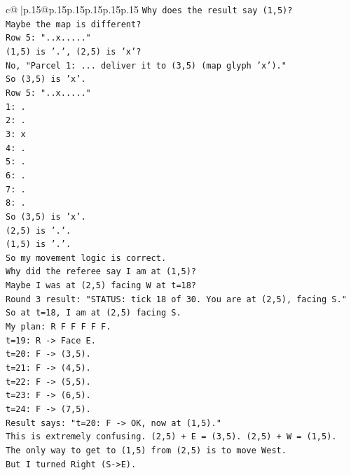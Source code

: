 \documentclass{article}
\begin{document}
{\begin{supertabular}{c@{$\;$}|p{.15\linewidth}@{}p{.15\linewidth}p{.15\linewidth}p{.15\linewidth}p{.15\linewidth}p{.15\linewidth}}
{{{\texttt{Why does the result say (1,5)?} \\
\texttt{Maybe the map is different?} \\
\texttt{Row 5: "..x....."} \\
\texttt{(1,5) is '.', (2,5) is 'x'?} \\
\texttt{No, "Parcel 1: ... deliver it to (3,5) (map glyph 'x')."} \\
\texttt{So (3,5) is 'x'.} \\
\texttt{Row 5: "..x....."} \\
\texttt{1: .} \\
\texttt{2: .} \\
\texttt{3: x} \\
\texttt{4: .} \\
\texttt{5: .} \\
\texttt{6: .} \\
\texttt{7: .} \\
\texttt{8: .} \\
\texttt{So (3,5) is 'x'.} \\
\texttt{(2,5) is '.'.} \\
\texttt{(1,5) is '.'.} \\
\texttt{So my movement logic is correct.} \\
\texttt{Why did the referee say I am at (1,5)?} \\
\texttt{Maybe I was at (2,5) facing W at t=18?} \\
\texttt{Round 3 result: "STATUS: tick 18 of 30. You are at (2,5), facing S."} \\
\texttt{So at t=18, I am at (2,5) facing S.} \\
\texttt{My plan: R F F F F F.} \\
\texttt{t=19: R {-}> Face E.} \\
\texttt{t=20: F {-}> (3,5).} \\
\texttt{t=21: F {-}> (4,5).} \\
\texttt{t=22: F {-}> (5,5).} \\
\texttt{t=23: F {-}> (6,5).} \\
\texttt{t=24: F {-}> (7,5).} \\
\texttt{Result says: "t=20: F {-}> OK, now at (1,5)."} \\
\texttt{This is extremely confusing. (2,5) + E = (3,5). (2,5) + W = (1,5).} \\
\texttt{The only way to get to (1,5) from (2,5) is to move West.} \\
\texttt{But I turned Right (S{-}>E).} \\
}}}
\end{supertabular}}
\end{document}
